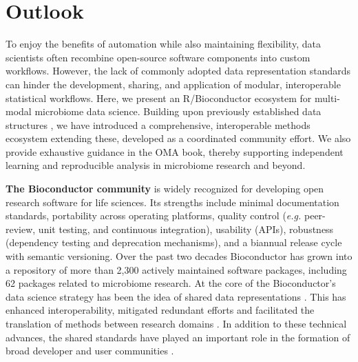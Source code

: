 \documentclass[
  sn-nature,
]{sn-jnl}
\begin{document}
\section{Outlook}\label{sec-discussion}

To enjoy the benefits of automation while also maintaining flexibility,
data scientists often recombine open-source software components into
custom workflows. However, the lack of commonly adopted data
representation standards can hinder the development, sharing, and
application of modular, interoperable statistical workflows. Here, we
present an R/Bioconductor ecosystem for multi-modal microbiome data
science. Building upon previously established data structures
\citep{huang2021, ramos2017}, we have introduced a comprehensive,
interoperable methods ecosystem extending these, developed as a
coordinated community effort. We also provide exhaustive guidance in the
OMA book, thereby supporting independent learning and reproducible
analysis in microbiome research and beyond.

\textbf{The Bioconductor community} is widely recognized for developing
open research software for life sciences. Its strengths include minimal
documentation standards, portability across operating platforms, quality
control (\emph{e.g.} peer-review, unit testing, and continuous
integration), usability (APIs), robustness (dependency testing and
deprecation mechanisms), and a biannual release cycle with semantic
versioning. Over the past two decades Bioconductor has grown into a
repository of more than 2,300 actively maintained software packages,
including 62 packages related to microbiome research. At the core of the
Bioconductor's data science strategy has been the idea of shared data
representations \citep{gentleman2004, lawrence2013}. This has enhanced
interoperability, mitigated redundant efforts and facilitated the
translation of methods between research domains
\citep{delia2023, barker2022}. In addition to these technical advances,
the shared standards have played an important role in the formation of
broad developer and user communities \citep{drnevich2025}.
\end{document}
